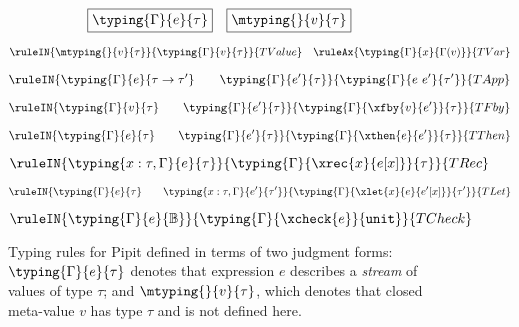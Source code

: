 \begin{figure}
  \[
    \boxed{\typing{\Gamma}{e}{\tau}}
    \quad
    \boxed{\mtyping{}{v}{\tau}}
  \]

  \[
    \ruleIN{
      \mtyping{}{v}{\tau}
    }{
      \typing{\Gamma}{v}{\tau}
    }{TValue}
    \quad
    \ruleAx{\typing{\Gamma}{x}{\Gamma(v)}}{TVar}
  \]

  \[
    \ruleIN{
      \typing{\Gamma}{e}{\tau \to \tau'}
      \qquad
      \typing{\Gamma}{e'}{\tau}
    }{\typing{\Gamma}{e~e'}{\tau'}}{TApp}
  \]

  \[
    \ruleIN{
      \typing{\Gamma}{v}{\tau}
      \qquad
      \typing{\Gamma}{e'}{\tau}
    }{
      \typing{\Gamma}{\xfby{v}{e'}}{\tau}
    }{TFby}
  \]

  \[
    \ruleIN{
      \typing{\Gamma}{e}{\tau}
      \qquad
      \typing{\Gamma}{e'}{\tau}
    }{\typing{\Gamma}{\xthen{e}{e'}}{\tau}}{TThen}
  \]

  \[
    \ruleIN{
      \typing{x : \tau, \Gamma}{e}{\tau}
    }{
      \typing{\Gamma}{\xrec{x}{e[x]}}{\tau}
    }{TRec}
  \]

  \[
    \ruleIN{
      \typing{\Gamma}{e}{\tau}
      \qquad
      \typing{x : \tau, \Gamma}{e'}{\tau'}
    }{
      \typing{\Gamma}{\xlet{x}{e}{e'[x]}}{\tau'}
    }{TLet}
  \]

  \[
    \ruleIN{
      \typing{\Gamma}{e}{\mathbb{B}}
    }{
      \typing{\Gamma}{\xcheck{e}}{\tt{unit}}
    }{TCheck}
  \]

  \caption{Typing rules for Pipit defined in terms of two judgment forms: $\typing{\Gamma}{e}{\tau}$ denotes that expression $e$ describes a \emph{stream} of values of type $\tau$; and $\mtyping{}{v}{\tau}$, which denotes that closed meta-value $v$ has type $\tau$ and is not defined here.}\label{f:core-typing}
\end{figure}